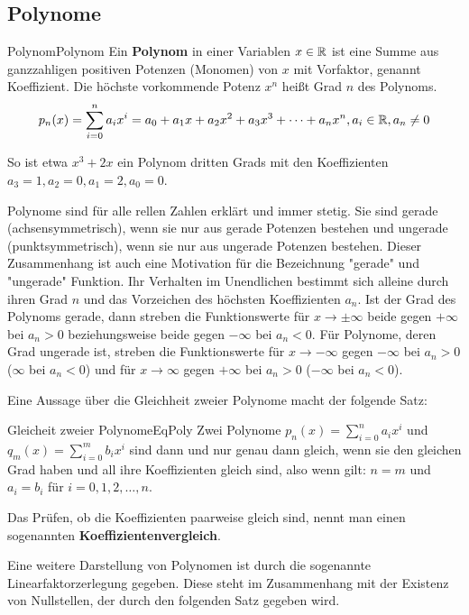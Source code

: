 \subsection{Polynome}

\begin{definition}{Polynom}{Polynom}
    Ein \textbf{Polynom} in einer Variablen $x\in \mathbb{R}$ ist eine Summe aus ganzzahligen positiven Potenzen (Monomen) von $x$ mit Vorfaktor, genannt Koeffizient. Die höchste vorkommende Potenz $x^n$ heißt Grad $n$ des Polynoms.
    $$
        p_n(x) = \sum\limits_{i=0}^n a_i x^i = a_0 + a_1 x + a_2 x^2 + a_3 x^3 + \dots + a_n x^n, a_i \in \mathbb{R}, a_n \ne 0
    $$
\end{definition}

So ist etwa $x^3+2x$ ein Polynom dritten Grads mit den Koeffizienten $a_3 = 1, a_2 = 0, a_1 = 2, a_0=0$.

Polynome sind für alle rellen Zahlen erklärt und immer stetig. Sie sind gerade (achsensymmetrisch), wenn sie nur aus gerade Potenzen bestehen und ungerade (punktsymmetrisch), wenn sie nur aus ungerade Potenzen bestehen. Dieser Zusammenhang ist auch eine Motivation für die Bezeichnung "gerade" und "ungerade" Funktion. Ihr Verhalten im Unendlichen bestimmt sich alleine durch ihren Grad $n$ und das Vorzeichen des höchsten Koeffizienten $a_n$. Ist der Grad des Polynoms gerade, dann streben die Funktionswerte für $x\to\pm\infty$ beide gegen $+\infty$ bei $a_n > 0$ beziehungsweise beide gegen $-\infty$ bei $a_n < 0$. Für Polynome, deren Grad ungerade ist, streben die Funktionswerte für $x \to -\infty$ gegen $-\infty$ bei $a_n > 0$ ($\infty$ bei $a_n < 0$) und für $x \to \infty$ gegen $+\infty$ bei $a_n > 0$ ($-\infty$ bei $a_n < 0$).

Eine Aussage über die Gleichheit zweier Polynome macht der folgende Satz:

\begin{statement}{Gleicheit zweier Polynome}{EqPoly}
    Zwei Polynome $p_n(x) = \sum\limits_{i=0}^n a_i x^i$ und $q_m(x) = \sum\limits_{i=0}^m b_i x^i$ sind dann und nur genau dann gleich, wenn sie den gleichen Grad haben und all ihre Koeffizienten gleich sind, also wenn gilt: $n=m$ und $a_i = b_i$ für $i=0,1,2,\dots,n$.
\end{statement}

Das Prüfen, ob die Koeffizienten paarweise gleich sind, nennt man einen sogenannten \textbf{Koeffizientenvergleich}.

Eine weitere Darstellung von Polynomen ist durch die sogenannte Linearfaktorzerlegung gegeben. Diese steht im Zusammenhang mit der Existenz von Nullstellen, der durch den folgenden Satz gegeben wird.

